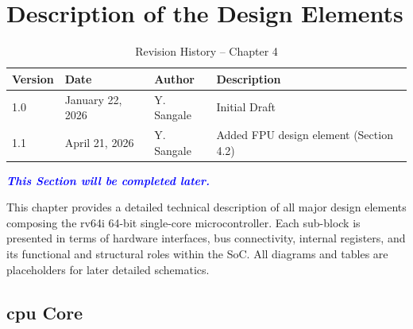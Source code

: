 \chapter{Description of the Design Elements}
\label{chap:design_elements}

\begin{table}[H]
    \caption{Revision History – Chapter 4}
    \centering
    \begin{tabular}{llll}
        \toprule
        Version & Date             & Author     & Description                            \\
        \midrule
        1.0     & January 22, 2026 & Y. Sangale & Initial Draft                          \\
        \midrule
        1.1     & April 21, 2026   & Y. Sangale & Added FPU design element (Section 4.2) \\
        \bottomrule
    \end{tabular}
\end{table}

\textcolor{blue}{\textbf{\textit{This Section will be completed later.}}}

This chapter provides a detailed technical description of all major design
elements composing the \gls{rv64i} 64-bit single-core microcontroller. Each
sub-block is presented in terms of hardware interfaces, bus connectivity,
internal registers, and its functional and structural roles within the
\gls{SoC}. All diagrams and tables are placeholders for later detailed
schematics.

\section{\gls{cpu} Core}

